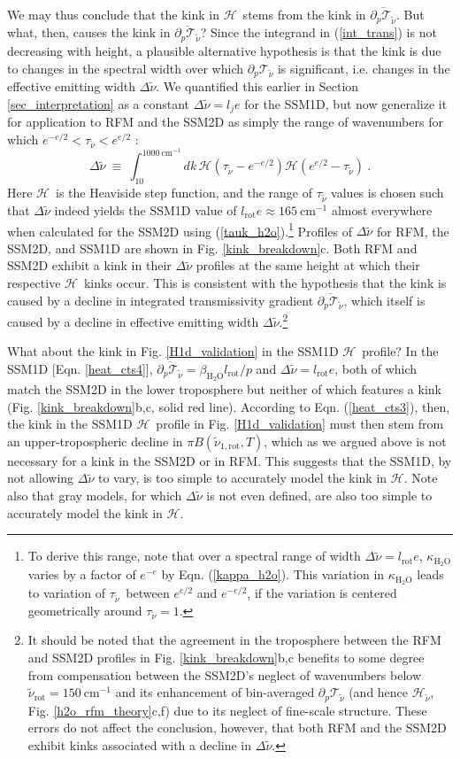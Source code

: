 \documentclass{ametsoc}
\newcommand{\beqn}{\begin{equation}}
\newcommand{\eeqn}{\end{equation}}
\newcommand{\eqnref}[1]{(\ref{#1})}
\newcommand{\cminverse}{\ensuremath{\mathrm{cm^{-1}}}}
\newcommand{\ppp}{\ensuremath{\partial_p}}
\newcommand{\htwo}{\ensuremath{\mathrm{H_2O}}}
\newcommand{\wv}{\ensuremath{\widetilde{\nu}}}
\newcommand{\trans}{\ensuremath{\mathcal{T}}}
\newcommand{\ch}{\ensuremath{\mathcal{H}}}
\newcommand{\chk}{\ensuremath{\ch_{\wv}}}
\newcommand{\lj}{\ensuremath{l_j}}
\newcommand{\tauk}{\ensuremath{\tau_{\wv}}}
\newcommand{\krot}{\ensuremath{\wv_\mathrm{rot}}}
\newcommand{\konerot}{\ensuremath{\wv_{1,\mathrm{rot}}}}
\newcommand{\lrot}{\ensuremath{l_\mathrm{rot}}}
\begin{document}
We may thus conclude that the kink in \ch\ stems from the kink in $\overline{\ppp \trans_{\wv}}$. But what, then,  causes the kink in $\overline{\ppp \trans_{\wv}}$? Since the integrand in \eqnref{int_trans} is not decreasing with height,  a plausible alternative hypothesis is that the kink is due to  changes in the spectral width over which $\ppp \trans_{\wv}$ is significant, i.e. changes in  the effective emitting width $\Delta \wv$. We quantified this earlier in Section \ref{sec_interpretation} as a constant $\Delta \wv = \lj e$ for the SSM1D, but now generalize it for application to RFM and the SSM2D as simply the range of wavenumbers for which $e^{-e/2} < \tauk < e^{e/2}$ :
\beqn
	\Delta \wv \ \equiv \  \int_{10}^{1000\ \cminverse} dk\, \ch(\tauk-e^{-e/2})\ch(e^{e/2}-\tauk) \ .
	\label{eqn_deltak}
\eeqn
Here \ch\ is the Heaviside step function, and the range of $\tauk$ values is chosen such that $\Delta \wv$ indeed yields the SSM1D value of $\lrot e\approx 165\ \cminverse$  almost everywhere when calculated for the SSM2D using \eqnref{tauk_h2o}.\footnote{To derive this range, note that over a spectral range of width $\Delta \wv =\lrot e$, $\kappa_{\htwo}$ varies by a factor of $e^{-e}$ by Eqn. \eqnref{kappa_h2o}. This variation in $\kappa_{\htwo}$ leads to variation of \tauk\ between $e^{e/2}$ and $e^{-e/2}$, if the variation is centered geometrically around $\tauk=1$.}  Profiles of $\Delta \wv$ for RFM, the SSM2D, and SSM1D are shown in Fig. \ref{kink_breakdown}c.  Both RFM and SSM2D exhibit a kink in their $\Delta \wv$ profiles at the same height at which their respective \ch\ kinks occur. This is consistent with the hypothesis that  the kink is caused by a decline in integrated transmissivity gradient $\overline{\ppp \trans_{\wv}}$, which itself is caused by a decline in effective emitting width $\Delta \wv$.\footnote{It should be noted that the agreement in the troposphere between the RFM and SSM2D profiles in Fig. \ref{kink_breakdown}b,c benefits to some degree from compensation between the SSM2D's neglect of wavenumbers below $\krot = 150\ \cminverse$ and its enhancement of bin-averaged $\ppp \trans_{\wv}$ (and hence \chk, Fig. \ref{h2o_rfm_theory}c,f) due to its neglect of fine-scale structure. These errors do not affect the conclusion, however, that both RFM and the SSM2D exhibit kinks associated with a decline in $\Delta \wv$.}
 
What about the kink in Fig. \ref{H1d_validation} in the SSM1D \ch\ profile? In the SSM1D [Eqn. \ref{heat_cts4}], $\overline{\ppp \trans_{\wv}} = \beta_{\htwo}\lrot/p$ and $\Delta \wv = \lrot e$, both of which match the SSM2D in the lower troposphere but neither of which features a kink (Fig. \ref{kink_breakdown}b,c, solid red line).  According to Eqn. \eqnref{heat_cts3}, then, the kink in the SSM1D \ch\ profile in Fig. \ref{H1d_validation} must then stem from an upper-tropospheric decline in $\pi B(\konerot,T)$, which as we argued above is not necessary for a kink in the SSM2D or in RFM. This suggests that the SSM1D, by not allowing $\Delta \wv$ to vary, is too simple to accurately model the kink in \ch. Note also that gray models, for which $\Delta \wv$ is not even defined, are also too simple to accurately model the kink in \ch.
\end{document}
